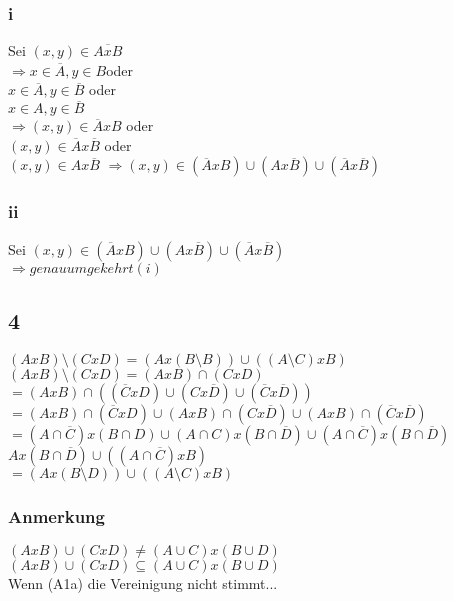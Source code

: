\documentclass[11pt]{scrartcl}
\begin{document}
\subsubsection{i}
Sei $(x,y) \in \overline{AxB}$ \\
$\Rightarrow x \in \overline{A}, y \in B $oder \\
$x\in \overline{A}, y \in \overline{B}$ oder \\
$x \in A, y \in \overline{B}$ \\
$\Rightarrow (x,y) \in \overline{A} x B$ oder \\
$(x,y) \in \overline{A} x \overline{B}$ oder \\
$(x,y) \in A x \overline{B}$
$\Rightarrow (x,y) \in (\overline{A} x B) \cup (A x  \overline{B}) \cup (\overline{A} x \overline{B})$
\subsubsection{ii}
Sei $(x,y) \in (\overline{A} x B) \cup (A x \overline{B}) \cup (\overline{A} x \overline{B})$ \\
$\Rightarrow genau umgekehrt (i)$

\subsection{4}
$(AxB) \setminus (CxD) = (Ax(B \setminus B)) \cup ((A \setminus C) xB)$ \\
$(AxB) \setminus (CxD) = (AxB) \cap (CxD)$ \\
$= (AxB) \cap ((\overline{C} xD) \cup (Cx \overline{D}) \cup (\overline{C} x \overline{D})) $ \\
$= (AxB) \cap (\overline{C} x D) \cup (AxB) \cap (C x \overline{D}) \cup (AxB) \cap (\overline{C} x \overline{D})$ \\
$= (A \cap \overline{C})x(B \cap D) \cup (A \cap C)x(B \cap \overline{D}) \cup (A \cap \overline{C})x(B \cap \overline{D})$ \\
$Ax(B \cap \overline{D}) \cup ((A \cap \overline{C})xB)$ \\
$= (Ax(B \setminus D)) \cup ((A \setminus C)xB)$
\subsubsection*{Anmerkung}
$(AxB) \cup (CxD) \neq (A \cup C)x(B \cup D)$ \\
$(AxB) \cup (CxD) \subseteq (A \cup C)x (B \cup D)$ \\
Wenn (A1a) die Vereinigung nicht stimmt...
\end{document}
